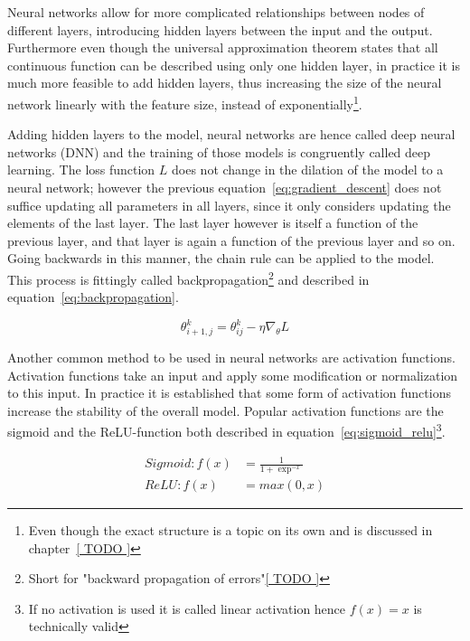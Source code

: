 Neural networks allow for more complicated relationships between nodes of different layers,
introducing hidden layers between the input and the output.
Furthermore even though the universal approximation theorem states that all continuous function
can be described using only one hidden layer, in practice it is much more feasible to
add hidden layers, thus increasing the size of the neural network linearly with the feature size,
instead of exponentially\footnote{Even though the exact structure is a topic on its own and is
discussed in chapter~\ref{ TODO }}.

Adding hidden layers to the model, neural networks are hence called deep neural networks (DNN)
and the training of those models is congruently called deep learning.
The loss function $L$ does not change in the dilation of the model to a neural network;
however the previous equation~\eqref{eq:gradient_descent} does not suffice updating all
parameters in all layers, since it only considers updating the elements of the last layer.
The last layer however is itself a function of the previous layer, and that layer is again
a function of the previous layer and so on. Going backwards in this manner, the chain rule can be
applied to the model. This process is fittingly called
backpropagation\footnote{Short for "backward propagation of errors"\ref{ TODO }} and described in
equation~\eqref{eq:backpropagation}.

\begin{equation} \label{eq:backpropagation}
\theta_{i+1, j}^k = \theta_{ij}^k - \eta \nabla_\theta L
\end{equation}

Another common method to be used in neural networks are activation functions.
Activation functions take an input and apply some modification or normalization
to this input. In practice it is established that some form of activation functions
increase the stability of the overall model.
Popular activation functions are the sigmoid and the ReLU-function both described in
equation~\eqref{eq:sigmoid_relu}\footnote{If no activation is used it is called linear
activation hence $f(x) = x$ is technically valid}.

\begin{equation} \label{sigmoid_relu}
\begin{split}
Sigmoid: f(x) & = \frac{1}{1 + \exp^{-x}} \\
ReLU   : f(x) & = max(0, x)
\end{split}
\end{equation}

